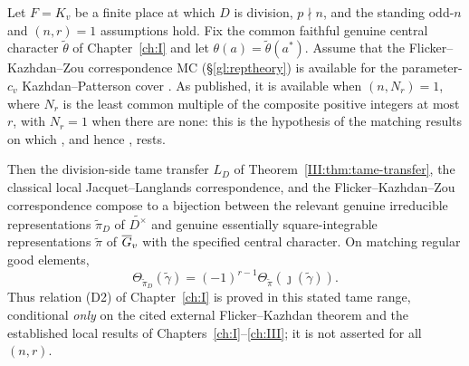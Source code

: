 \begin{corollary}\label{III:cor:D2tame}
Let $F=K_v$ be a finite place at which $D$ is division,
$p\nmid n$, and the standing odd-$n$ and $(n,r)=1$ assumptions
hold. Fix the common faithful genuine central character
$\widetilde\theta$ of Chapter~\ref{ch:I} and let
$\theta(a)=\widetilde\theta(a^*)$.
Assume that the Flicker--Kazhdan--Zou correspondence
$\mathrm{MC}$ (\S\ref{gl:reptheory}) is available for the
parameter-$c_v$ Kazhdan--Patterson cover
\cite[Proposition~3.6 and Definition~3.7]{Zo23}. As published, it
is available when $(n,N_r)=1$, where $N_r$ is the least common
multiple of the composite positive integers at most $r$, with
$N_r=1$ when there are none: this is the hypothesis of the
matching results \cite[\S12, Corollary; \S13, Theorem]{FK86} on
which \cite[\S26, Theorem]{FK86}, and hence \cite{Zo23}, rests.

Then the division-side tame transfer $L_D$ of
Theorem~\ref{III:thm:tame-transfer}, the classical local
Jacquet--Langlands correspondence, and the Flicker--Kazhdan--Zou
correspondence compose to a bijection between the relevant
genuine irreducible representations $\widetilde\pi_D$ of
$\widetilde{D^\times}$ and genuine essentially square-integrable
representations $\widetilde\pi$ of $\overline{G}_v$ with the specified
central character.  On matching regular good elements,
\begin{equation}\label{III:eq:tame-D2}
 \boxed{\quad
 \Theta_{\widetilde\pi_D}(\widetilde\gamma)
 =(-1)^{r-1}\Theta_{\widetilde\pi}
       (\jmath(\widetilde\gamma)).\quad}
\end{equation}
Thus relation (D2) of Chapter~\ref{ch:I} is proved in this stated tame
range, conditional \emph{only} on the cited external
Flicker--Kazhdan theorem and the established local results of
Chapters~\ref{ch:I}--\ref{ch:III}; it is not asserted for all $(n,r)$.
\end{corollary}
